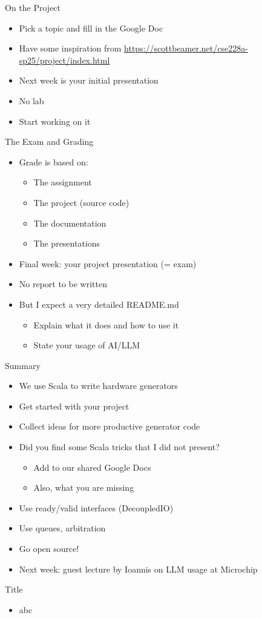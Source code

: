\begin{frame}[fragile]{On the Project}
\begin{itemize}
\item Pick a topic and fill in the Google Doc
\item Have some inspiration from \url{https://scottbeamer.net/cse228a-sp25/project/index.html}
\item Next week is your initial presentation
\item No lab
\item Start working on it
\end{itemize}
\end{frame}

\begin{frame}[fragile]{The Exam and Grading}
\begin{itemize}
\item Grade is based on:
\begin{itemize}
\item The assignment
\item The project (source code)
\item The documentation
\item The presentations
\end{itemize}
\item Final week: your project presentation (= exam)
\item No report to be written
\item But I expect a very detailed README.md
\begin{itemize}
\item Explain what it does and how to use it
\item State your usage of AI/LLM
\end{itemize}
\end{itemize}
\end{frame}

\begin{frame}[fragile]{Summary}
\begin{itemize}
\item We use Scala to write hardware generators
\item Get started with your project
\item Collect ideas for more productive generator code
\item Did you find some Scala tricks that I did not present?
\begin{itemize}
\item Add to our shared Google Docs
\item Also, what you are missing
\end{itemize}
\item Use ready/valid interfaces (DecoupledIO)
\item Use queues, arbitration
\item Go open source!
\item Next week: guest lecture by Ioannis on LLM usage at Microchip
\end{itemize}
\end{frame}



\begin{frame}[fragile]{Title}
\begin{itemize}
\item abc
\end{itemize}
\end{frame}
